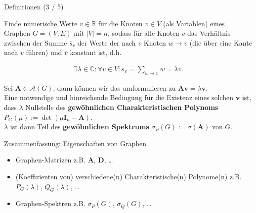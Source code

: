\documentclass[aspectratio=169]{beamer}
\begin{document}
\begin{frame}{Definitionen (3 / 5)}
    
    \begin{definition*}
        
        Finde numerische Werte $\overline v \in \mathbb R$ für die Knoten $v \in V$ (als Variablen) eines Graphen $G = (V, E)$ mit $|V| = n$, sodass für alle Knoten $v$ das Verhältnis zwischen der Summe $\overline s_v$ der Werte der nach $v$ Knoten $w \to v$ (die über eine Kante nach $v$ führen) und $\overline v$ konstant ist, d.h.
    
        \begin{align*}
            \exists \lambda \in \mathbb C:
                \forall v \in V:
                    \overline s_v = \sum_{w \to v} \overline w = \lambda \overline v.
        \end{align*}
    
        Sei $\mathbf A \in \mathcal A(G)$, dann können wir das umformulieren zu $\mathbf A \mathbf v = \lambda \mathbf v$. \\
        Eine notwendige und hinreichende Bedingung für die Existenz eines solchen $\mathbf v$ ist, dass $\lambda$ Nullstelle des \textbf{gewöhnlichen Charakteristischen Polynoms} $P_G(\mu) := \det(\mu \mathbf I_n - \mathbf A)$. \\
        $\lambda$ ist dann Teil des \textbf{gewöhnlichen Spektrums} $\sigma_P(G) := \sigma(\mathbf A)$ von $G$.

    \end{definition*}

\end{frame}

\begin{frame}{Zusammenfassung:  Eigenschaften von Graphen}

    \begin{block}{}

        \begin{itemize}
            \item Graphen-Matrizen z.B. $\mathbf A$, $\mathbf D$, \dots
            \item (Koeffizienten von) verschiedene(n) Charakteristische(n) Polynome(n) z.B. $P_G(\lambda)$, $Q_G(\lambda)$, \dots
            \item Graphen-Spektren z.B. $\sigma_P(G)$, $\sigma_Q(G)$, \dots
        \end{itemize}

    \end{block}

\end{frame}
\end{document}
